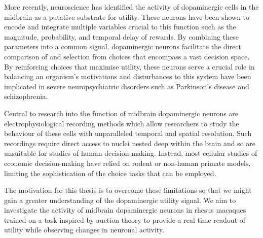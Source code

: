 \begin{motivation}
More recently, neuroscience has identified the activity of dopaminergic cells in the midbrain as a putative substrate for utility. These neurons have been shown to encode and integrate multiple variables crucial to this function such as the magnitude, probability, and temporal delay of rewards. By combining these parameters into a common signal, dopaminergic neurons facilitate the direct comparison of and selection from choices that encompass a vast decision space. By reinforcing choices that maximise utility, these neurons serve a crucial role in balancing an organism’s motivations and disturbances to this system have been implicated in severe neuropsychiatric disorders such as Parkinson’s disease and schizophrenia.

Central to research into the function of midbrain dopaminergic neurons are electrophysiological recording methods which allow researchers to study the behaviour of these cells with unparalleled temporal and spatial resolution. Such recordings require direct access to nuclei nested deep within the brain and so are unsuitable for studies of human decision making. Instead, most cellular studies of economic decision-making have relied on rodent or non-human primate models, limiting the sophistication of the choice tasks that can be employed.

The motivation for this thesis is to overcome these limitations so that we might gain a greater understanding of the dopaminergic utility signal. We aim to investigate the activity of midbrain dopaminergic neurons in rhesus macaques trained on a task inspired by auction theory to provide a real time readout of utility while observing changes in neuronal activity.
\end{motivation}
